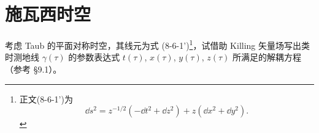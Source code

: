 
\chapter{施瓦西时空}

\begin{xiti}
	\item 考虑 Taub 的平面对称时空，其线元为式 (8-6-1')\footnote{正文(8-6-1')为
	\begin{equation*}
		\dd{s}^2 = z^{-1/2} \left( - \dd{t}^2 + \dd{z}^2 \right) + z \left( \dd{x}^2 + \dd{y}^2 \right). \tag{8-6-1'}
	\end{equation*}}，试借助 Killing 矢量场写出类时测地线 $\gamma(\tau)$ 的参数表达式 $t(\tau)$, $x(\tau)$, $y(\tau)$, $z(\tau)$ 所满足的解耦方程 （参考 \S 9.1）。


\end{xiti}
